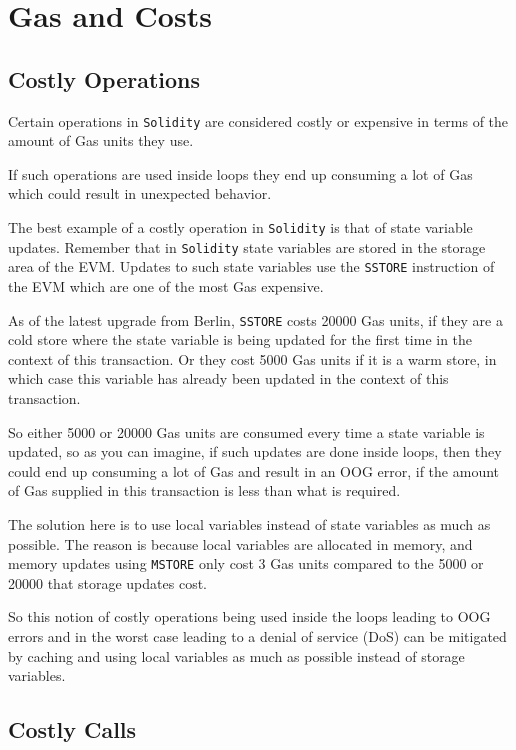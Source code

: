 \section{Gas and Costs}\label{gas-and-costs}

\subsection{Costly Operations}\label{costly-operations}

Certain operations in \texttt{Solidity} are considered costly or
expensive in terms of the amount of Gas units they use.

If such operations are used inside loops they end up consuming a lot of
Gas which could result in unexpected behavior.

The best example of a costly operation in \texttt{Solidity} is that of
state variable updates. Remember that in \texttt{Solidity} state
variables are stored in the storage area of the EVM. Updates to such
state variables use the \texttt{SSTORE} instruction of the EVM which are
one of the most Gas expensive.

As of the latest upgrade from Berlin, \texttt{SSTORE} costs 20000 Gas
units, if they are a cold store where the state variable is being
updated for the first time in the context of this transaction. Or they
cost 5000 Gas units if it is a warm store, in which case this variable
has already been updated in the context of this transaction.

So either 5000 or 20000 Gas units are consumed every time a state
variable is updated, so as you can imagine, if such updates are done
inside loops, then they could end up consuming a lot of Gas and result
in an OOG error, if the amount of Gas supplied in this transaction is
less than what is required.

The solution here is to use local variables instead of state variables
as much as possible. The reason is because local variables are allocated
in memory, and memory updates using \texttt{MSTORE} only cost 3 Gas
units compared to the 5000 or 20000 that storage updates cost.

So this notion of costly operations being used inside the loops leading
to OOG errors and in the worst case leading to a denial of service (DoS)
can be mitigated by caching and using local variables as much as
possible instead of storage variables.

\subsection{Costly Calls}\label{costly-calls}


